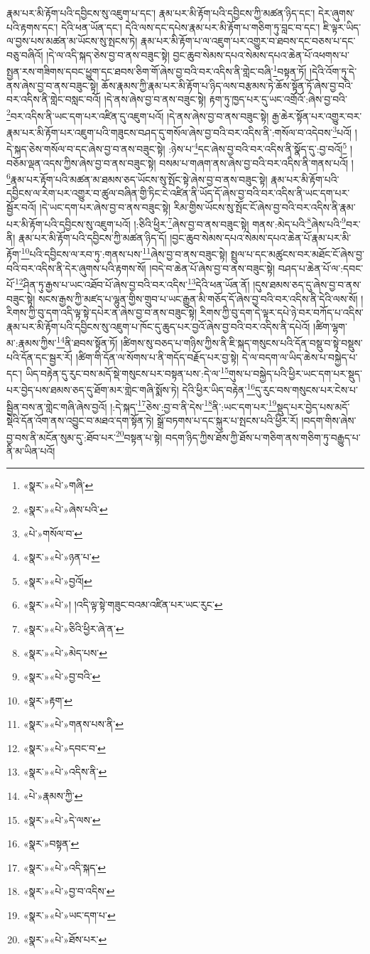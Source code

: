 རྣམ་པར་མི་རྟོག་པའི་དབྱིངས་སུ་འཇུག་པ་དང་། རྣམ་པར་མི་རྟོག་པའི་དབྱིངས་ཀྱི་མཚན་ཉིད་དང་། དེར་ཞུགས་པའི་རྟགས་དང་། དེའི་ཕན་ཡོན་དང་། དེའི་ལས་དང་དཔེས་རྣམ་པར་མི་རྟོག་པ་གཅིག་ཏུ་བླང་བ་དང་། ཇི་ལྟར་ཡིད་ལ་བྱས་པས་མཚན་མ་ཡོངས་སུ་སྤངས་ཏེ། རྣམ་པར་མི་རྟོག་པ་ལ་འཇུག་པར་འགྱུར་བ་ཐབས་དང་བཅས་པ་དང་བཅུ་བཞིའོ། །དེ་ལ་འདི་སྐད་ཅེས་བྱ་བ་ནས་བཟུང་སྟེ། བྱང་ཆུབ་སེམས་དཔའ་སེམས་དཔའ་ཆེན་པོ་འཕགས་པ་སྤྱན་རས་གཟིགས་དབང་ཕྱུག་དང་ཐབས་ཅིག་གོ་ཞེས་བྱ་བའི་བར་འདིས་ནི་གླེང་བཞི་\footnote{«སྣར་»«པེ་»གཞི་}བསྟན་ཏོ། །དེའི་འོག་ཏུ་དེ་ནས་ཞེས་བྱ་བ་ནས་བཟུང་སྟེ། ཆོས་རྣམས་ཀྱི་རྣམ་པར་མི་རྟོག་པ་ཉིད་ལས་བརྩམས་ཏེ་ཆོས་སྟོན་ཏོ་ཞེས་བྱ་བའི་བར་འདིས་ནི་གླེང་བསླང་བའོ། །དེ་ནས་ཞེས་བྱ་བ་ནས་བཟུང་སྟེ། རྟག་ཏུ་ཁྱད་པར་དུ་ཡང་འགྲོའོ་:ཞེས་བྱ་བའི་\footnote{«སྣར་»«པེ་»ཞེས་པའི་}བར་འདིས་ནི་ཡང་དག་པར་འཛིན་དུ་འཇུག་པའོ། །དེ་ནས་ཞེས་བྱ་བ་ནས་བཟུང་སྟེ། རྒྱ་ཆེར་སྟོན་པར་འགྱུར་བར་རྣམ་པར་མི་རྟོག་པར་འཇུག་པའི་གཟུངས་བཤད་དུ་གསོལ་ཞེས་བྱ་བའི་བར་འདིས་ནི་:གསོལ་བ་འདེབས་\footnote{«པེ་»གསོལ་བ་}པའོ། །དེ་སྐད་ཅེས་གསོལ་བ་དང་ཞེས་བྱ་བ་ནས་བཟུང་སྟེ། :ཉེས་པ་\footnote{«སྣར་»«པེ་»ཉན་པ་}དང་ཞེས་བྱ་བའི་བར་འདིས་ནི་སྣོད་དུ་:བྱ་བའོ།\footnote{«སྣར་»«པེ་»བྱའོ།} །བཅོམ་ལྡན་འདས་ཀྱིས་ཞེས་བྱ་བ་ནས་བཟུང་སྟེ། བསམ་པ་གཞག་ནས་ཞེས་བྱ་བའི་བར་འདིས་ནི་གནས་པའོ། །\footnote{«སྣར་»«པེ་»། །འདི་ལྟ་སྟེ་གཟུང་བའམ་འཛིན་པར་ཡང་རུང་}རྣམ་པར་རྟོག་པའི་མཚན་མ་ཐམས་ཅད་ཡོངས་སུ་སྤོང་སྟེ་ཞེས་བྱ་བ་ནས་བཟུང་སྟེ། རྣམ་པར་མི་རྟོག་པའི་དབྱིངས་ལ་རེག་པར་འགྱུར་བ་ཚུལ་བཞིན་གྱི་ཏིང་ངེ་འཛིན་ནི་ཡོད་དོ་ཞེས་བྱ་བའི་བར་འདིས་ནི་ཡང་དག་པར་སྦྱོར་བའོ། །དེ་ཡང་དག་པར་ཞེས་བྱ་བ་ནས་བཟུང་སྟེ། རིམ་གྱིས་ཡོངས་སུ་སྤོང་ངོ་ཞེས་བྱ་བའི་བར་འདིས་ནི་རྣམ་པར་མི་རྟོག་པའི་དབྱིངས་སུ་འཇུག་པའོ། །:ཅིའི་ཕྱིར་\footnote{«སྣར་»«པེ་»ཅིའི་ཕྱིར་ཞེ་ན་}ཞེས་བྱ་བ་ནས་བཟུང་སྟེ། གནས་:མེད་པའི་\footnote{«སྣར་»«པེ་»མེད་པས་}ཞེས་པའི་\footnote{«སྣར་»«པེ་»བྱ་བའི་}བར་ནི། རྣམ་པར་མི་རྟོག་པའི་དབྱིངས་ཀྱི་མཚན་ཉིད་དོ། །བྱང་ཆུབ་སེམས་དཔའ་སེམས་དཔའ་ཆེན་པོ་རྣམ་པར་མི་རྟོག་\footnote{«སྣར་»རྟག་}པའི་དབྱིངས་ལ་རབ་ཏུ་:གནས་པས་\footnote{«སྣར་»«པེ་»གནས་པས་ནི་}ཞེས་བྱ་བ་ནས་བཟུང་སྟེ། སྤྲུལ་པ་དང་མཚུངས་བར་མཐོང་ངོ་ཞེས་བྱ་བའི་བར་འདིས་ནི་དེར་ཞུགས་པའི་རྟགས་སོ། །བདེ་བ་ཆེན་པོ་ཞེས་བྱ་བ་ནས་བཟུང་སྟེ། བཤད་པ་ཆེན་པོ་ལ་:དབང་པོ་\footnote{«སྣར་»«པེ་»དབང་བ་}ཤིན་ཏུ་རྒྱས་པ་ཡང་འཐོབ་པོ་ཞེས་བྱ་བའི་བར་འདིས་\footnote{«སྣར་»«པེ་»འདིས་ནི་}དེའི་ཕན་ཡོན་ནོ། །དུས་ཐམས་ཅད་དུ་ཞེས་བྱ་བ་ནས་བཟུང་སྟེ། སངས་རྒྱས་ཀྱི་མཛད་པ་ལྷུན་གྱིས་གྲུབ་པ་ཡང་རྒྱུན་མི་གཅོད་དོ་ཞེས་བྱ་བའི་བར་འདིས་ནི་དེའི་ལས་སོ། །རིགས་ཀྱི་བུ་དག་འདི་ལྟ་སྟེ་དཔེར་ན་ཞེས་བྱ་བ་ནས་བཟུང་སྟེ། རིགས་ཀྱི་བུ་དག་དེ་ལྟར་དཔེ་ཉེ་བར་བཀོད་པ་འདིས་རྣམ་པར་མི་རྟོག་པའི་དབྱིངས་སུ་འཇུག་པ་ཁོང་དུ་ཆུད་པར་བྱའོ་ཞེས་བྱ་བའི་བར་འདིས་ནི་དཔེའོ། །ཚིག་ལྷག་མ་:རྣམས་ཀྱིས་\footnote{«པེ་»རྣམས་ཀྱི་}ནི་ཐབས་སྟོན་ཏོ། །ཚིགས་སུ་བཅད་པ་གཉིས་ཀྱིས་ནི་ཇི་སྐད་གསུངས་པའི་དོན་བསྡུ་བ་སྟེ་བསྡུས་པའི་དོན་དང་སྦྱར་རོ། །ཚིག་གི་དོན་ལ་སོགས་པ་ནི་གདོད་བརྗོད་པར་བྱ་སྟེ། དེ་ལ་བདག་ལ་ཡིད་ཆེས་པ་བསྐྱེད་པ་དང་། ཡིད་བརྟེན་དུ་རུང་བས་མདོ་སྡེ་གསུངས་པར་བསྟན་པས་:དེ་ལ་\footnote{«སྣར་»«པེ་»དེ་ལས་}གུས་པ་བསྐྱེད་པའི་ཕྱིར་ཡང་དག་པར་སྡུད་པར་བྱེད་པས་ཐམས་ཅད་དུ་ཐོག་མར་གླེང་གཞི་སྨོས་ཏེ། དེའི་ཕྱིར་ཡིད་བརྟེན་\footnote{«སྣར་»བསྟན་}དུ་རུང་བས་གསུངས་པར་ངེས་པ་སྦྱིན་བས་ན་གླེང་གཞི་ཞེས་བྱའོ། །:དེ་སྐད་\footnote{«སྣར་»«པེ་»འདི་སྐད་}ཅེས་:བྱ་བ་ནི་དེས་\footnote{«སྣར་»«པེ་»བྱ་བ་འདིས་}ནི་:ཡང་དག་པར་\footnote{«སྣར་»«པེ་»ཡང་དག་པ་}སྡུད་པར་བྱེད་པས་མདོ་སྡེའི་དོན་འོག་ནས་འབྱུང་བ་མཐའ་དག་སྟོན་ཏེ། སྒྲོ་བཏགས་པ་དང་སྐུར་པ་སྤངས་པའི་ཕྱིར་རོ། །བདག་གིས་ཞེས་བྱ་བས་ནི་མངོན་སུམ་དུ་:ཐོབ་པར་\footnote{«སྣར་»«པེ་»ཐོས་པར་}བསྟན་པ་སྟེ། བདག་ཉིད་ཀྱིས་ཐོས་ཀྱི་ཐོས་པ་གཅིག་ནས་གཅིག་ཏུ་བརྒྱུད་པ་ནི་མ་ཡིན་པའོ། 